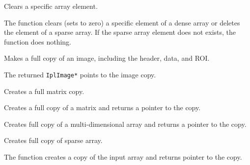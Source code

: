 Clears a specific array element.

\begin{description}
\end{description}

The function  clears (sets to zero) a specific element of a dense array or deletes the element of a sparse array. If the sparse array element does not exists, the function does nothing.

Makes a full copy of an image, including the header, data, and ROI.


\begin{description}
\end{description}

The returned \texttt{IplImage*} points to the image copy.

Creates a full matrix copy.


\begin{description}
\end{description}

Creates a full copy of a matrix and returns a pointer to the copy.

Creates full copy of a multi-dimensional array and returns a pointer to the copy.


\begin{description}
\end{description}


Creates full copy of sparse array.


\begin{description}
\end{description}

The function creates a copy of the input array and returns pointer to the copy.

